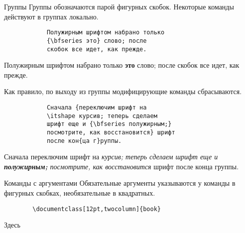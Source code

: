 \begin{frame}[fragile]{Группы}
	Группы обозначаются парой фигурных скобок. Некоторые команды действуют в группах локально.
	
	\begin{minipage}{0.49\textwidth}
		\begin{verbatim}
			Полужирным шрифтом набрано только 
			{\bfseries это} слово; после 
			скобок все идет, как прежде.
		\end{verbatim}
	\end{minipage}
	\begin{minipage}{0.49\textwidth}
		Полужирным шрифтом набрано только {\bfseries это}
		слово; после скобок все идет, как прежде.
	\end{minipage}

	Как правило, по выходу из группы модифицирующие команды сбрасываются.
	
	\begin{minipage}{0.54\textwidth}
		\begin{verbatim}
			Сначала {переключим шрифт на 
			\itshape курсив; теперь сделаем 
			шрифт еще и {\bfseries полужирным;}
			посмотрите, как восстановится} шрифт
			после кон{ца г}руппы.
		\end{verbatim}
	\end{minipage}
	\begin{minipage}{0.45\textwidth}
		Сначала {переключим шрифт на 
		\itshape курсив; теперь сделаем 
		шрифт еще и {\bfseries полужирным;}
		посмотрите, как восстановится} шрифт
	после кон{ца г}руппы.
	\end{minipage}
	
\end{frame}


\begin{frame}[fragile]{Команды с аргументами}
	Обязательные аргументы указываются у команды в фигурных скобках, необязательные в квадратных.
	
	\begin{verbatim}
		\documentclass[12pt,twocolumn]{book}
	\end{verbatim}
	
	Здесь 
	
\end{frame}


